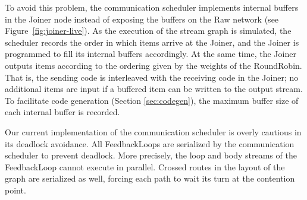 To avoid this problem, the communication scheduler implements internal
buffers in the Joiner node instead of exposing the buffers on the Raw
network (see Figure~\ref{fig:joiner-live}).  As the execution of the
stream graph is simulated, the scheduler records the order in which
items arrive at the Joiner, and the Joiner is programmed to fill its
internal buffers accordingly.  At the same time, the Joiner outputs
items according to the ordering given by the weights of the
RoundRobin.  That is, the sending code is interleaved with the
receiving code in the Joiner; no additional items are input if a
buffered item can be written to the output stream.  To facilitate code
generation (Section \ref{sec:codegen}), the maximum buffer size of
each internal buffer is recorded.

Our current implementation of the communication scheduler is overly
cautious in its deadlock avoidance.  All FeedbackLoops are serialized
by the communication scheduler to prevent deadlock.  More precisely,
the loop and body streams of the FeedbackLoop cannot execute in
parallel.  Crossed routes in the layout of the graph are serialized as
well, forcing each path to wait its turn at the contention point.
